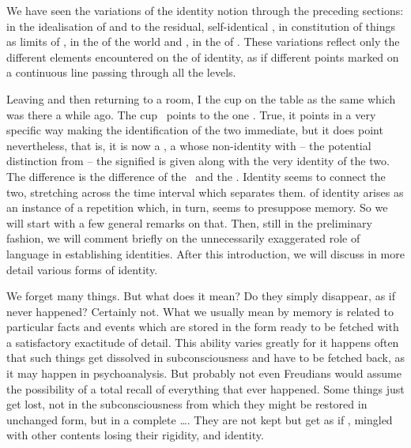 \label{sub:Identity}
We have seen the variations of the identity notion  through the
preceding sections: in the idealisation of  and  to
the residual, self-identical , in constitution of things as
limits of , in the  
  {of the world} and , in the  of . 
These variations reflect only the different elements encountered on the
 of identity, as if different points marked on a continuous line
passing through all the levels. 
  
Leaving and then returning to a room, I  the cup on the table as
the same which was there a while ago.  The cup \ points to the
one .  True, it points in a very specific way making the
identification of the two immediate, but it does point nevertheless, that is, it
is now a , a  whose non-identity with -- the
potential distinction from -- the signified is given along with the very
identity of the two. The difference is the difference of the 
\herenow\ and the  \thth. Identity seems to connect the two,
stretching across the time interval which separates them.   of
identity arises as an instance of a repetition which, in turn, seems to
presuppose memory. So we will start with a few general remarks on that. Then,
still in the preliminary fashion, we will comment briefly on the unnecessarily
exaggerated role of language in establishing identities. After this
introduction, we will discuss in more detail various forms of identity.


We forget many things.  But what does it mean?  Do they simply disappear,
as if never happened?  Certainly not.  What we usually mean by memory is related
to particular facts and  events which are stored in the 
form ready to be fetched with a satisfactory exactitude of detail.  This ability
varies greatly for it happens often that such  things get dissolved
in subconsciousness and have to be fetched back, as it may happen in
psychoanalysis.  But probably not even Freudians would assume the possibility of
a total recall of everything that ever happened. Some things just get lost, not
in the subconsciousness from which they might be restored in unchanged form, but
in a complete \ldots {}.  They are not kept  but get as if , mingled with other contents
losing their rigidity,  and identity.

